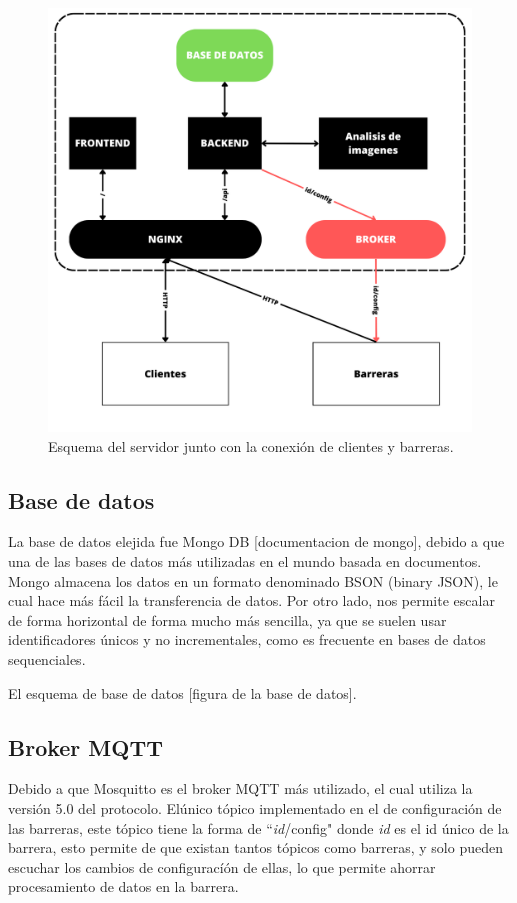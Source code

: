 \begin{figure}
    \centering
    \includegraphics[width=.8\textwidth]{imgs/server-esquema.png}
    \caption{Esquema del servidor junto con la conexión de clientes y barreras.}
    \label{fig:server-esquema}
\end{figure}

\subsection{Base de datos}

La base de datos elejida fue Mongo DB [documentacion de mongo], debido a que una de las bases de datos más utilizadas en el mundo basada en documentos. Mongo almacena los datos en un formato denominado BSON (binary JSON), le cual hace más fácil la transferencia de datos. Por otro lado, nos permite escalar de forma horizontal de forma mucho más sencilla, ya que se suelen usar identificadores únicos y no incrementales, como es frecuente en bases de datos sequenciales.

El esquema de base de datos [figura de la base de datos].

\subsection{Broker MQTT}

Debido a que Mosquitto es el broker MQTT más utilizado, el cual utiliza la versión 5.0 del protocolo. Elúnico tópico implementado en el de configuración de las barreras, este tópico tiene la forma de ``\textit{id}/config" donde \textit{id} es el id único de la barrera, esto permite de que existan tantos tópicos como barreras, y solo pueden escuchar los cambios de configuracíón de ellas, lo que permite ahorrar procesamiento de datos en la barrera.

